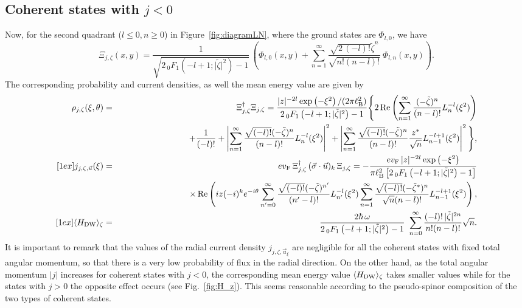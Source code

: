 \documentclass[aps,showpacs,showkeys]{revtex4}
\begin{document}
\subsection{Coherent states with $j<0$}
\label{sec4.2}
Now, for the second quadrant ($l\leq 0, n\geq 0$) in Figure~\ref{fig:diagramLN}, where the ground states are $\Phi_{l,0}$, we have
\begin{equation}\label{95}
 	\Xi_{j,\zeta}(x,y)= \frac1{\sqrt{2 \, _0F_1\left(-l+1;\vert \tilde{\zeta}\vert^2\right)-1}}\, \left(\Phi_{l,0}(x,y)+\sum_{n=1}^{\infty}\frac{\sqrt{2\,(-l)!}\tilde{\zeta}^n}{\sqrt{n!(n-l)!}}\ \Phi_{l,n}(x,y)\right).
\end{equation}
The corresponding probability and current densities, as well the mean energy value are given by
\begin{eqnarray}
 	 \rho_{j,\zeta}(\xi,\theta)&=& \Xi^{\dagger}_{j,\zeta} \Xi_{j,\zeta}	 =\frac{\vert z\vert^{-2l}\exp\left(-\xi^2\right)/(2\pi\ell_{\rm B}^{2})}{ 2 \, _0F_1\left(-l+1;\vert\tilde{\zeta}\vert^2\right)-1 }\Bigg\{ 2\, \textrm{Re}\left( \sum_{n=1}^{\infty}\frac{(-\tilde{\zeta})^n}{(n-l)!}L_{n}^{-l}(\xi^2)\right) \label{96a} 
	 \\
 	&&  \qquad\qquad\qquad\qquad + \frac{1}{(-l)!}+\left\vert\sum_{n=1}^{\infty}\frac{\sqrt{(-l)!}(-\tilde{\zeta})^n}{(n-l)!}L_{n}^{-l}(\xi^2)\right\vert^2+\left\vert\sum_{n=1}^{\infty}\frac{\sqrt{(-l)!}(-\tilde{\zeta})^n}{(n-l)!}\frac{z^\ast}{\sqrt{n}}L_{n-1}^{-l+1}(\xi^2)\right\vert^2\Bigg\}, \nonumber 
\\ [1ex]
	   j_{j,\zeta,\vec{u}}(\xi) &=& ev_{\rm F}\, \Xi^{\dagger}_{j,\zeta} \,(\vec{\sigma}\cdot\vec{u})_k\, \Xi_{j,\zeta} =-\frac{ev_{\rm F}\,\vert z\vert^{-2l}\exp\left(-\xi^2\right)}{\pi\ell_{\rm B}^{2}\left[2 \, _0F_1\left(-l+1;\vert\tilde{\zeta}\vert^2\right)-1\right]}  \label{96b}  \\
 	&&\qquad\qquad\qquad\qquad  \times\,\textrm{Re}\left( iz(-i)^{k}e^{-i\theta} \sum_{n'=0}^{\infty}\frac{\sqrt{(-l)!}(-\tilde{\zeta})^{n'}}{(n'-l)!}L_{n'}^{-l}(\xi^2) \sum_{n=1}^{\infty}\frac{\sqrt{(-l)!}(-\tilde{\zeta}^\ast)^{n}}{\sqrt{n}(n-l)!}L_{n-1}^{-l+1}(\xi^2)  \right), \nonumber
\\ [1ex]
 	\langle H_{\rm DW}\rangle_\zeta &=& \frac{2\hbar\,\omega}{2\,_0F_1\left(-l+1;\vert\tilde{\zeta}\vert^2\right)-1}\ \sum_{n=0}^{\infty}\frac{(-l)!\,\vert\tilde{\zeta}\vert^{2n}}{n!(n-l)!}\sqrt{n}. \label{96c}
\end{eqnarray}
It is important to remark that the values of the radial current density $j_{j,\zeta,\vec{u}_{\xi}}$ are negligible for all the coherent states with fixed total angular momentum, so that there is a very low probability of flux in the radial direction.
On the other hand, as the total angular momentum $\vert j\vert$ increases for coherent states with $j<0$, the corresponding mean energy value $\langle H_{\rm DW}\rangle_\zeta$ takes smaller values while for the states with $j>0$ the opposite effect occurs  (see Fig.~\ref{fig:H_z}). This seems reasonable according to the pseudo-spinor composition of the two types of coherent states.
\end{document}
